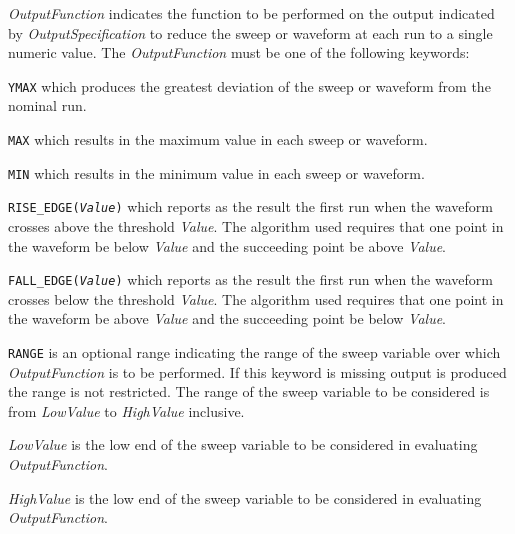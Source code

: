 {\begin{widelist}
\item[{\it OutputFunction}] indicates the function to be performed on the
     output indicated by {\it OutputSpecification} to reduce the sweep
     or waveform at each run to a single numeric value. The
     {\it OutputFunction} must be one of the following keywords:
     \item[{\tt YMAX}] which produces the greatest deviation of the sweep or
                       waveform from the nominal run.


     \item[{\tt MAX}] which results in the maximum value in each sweep or
                      waveform.

     \item[{\tt MIN}] which results in the minimum value in each sweep or
                      waveform.

     \item[{\tt RISE\_EDGE({\it Value})}] which reports as the result the
                      first run when the waveform crosses above the threshold
              {\it Value}.
              The algorithm used requires that
              one point in the waveform be below {\it Value}
              and the succeeding point be above {\it Value}.
\end{widelist}
\clearpage

\begin{widelist}
     \item[{\tt FALL\_EDGE({\it Value})}] which reports as the result the
                      first run when the waveform crosses below the threshold
              {\it Value}.
              The algorithm used requires that
              one point in the waveform be above {\it Value}
              and the succeeding point be below {\it Value}.


\item[{\tt RANGE}] is an optional range indicating the range of the sweep
                  variable over which {\it OutputFunction} is to be performed.
          If this keyword is missing output is produced
          the range is not restricted.  The range of the sweep
          variable to be considered is from {\it LowValue}
          to {\it HighValue} inclusive.

\item[{\it LowValue}] is the low end of the sweep variable to be considered
                  in evaluating {\it OutputFunction}.


\item[{\it HighValue}] is the low end of the sweep variable to be considered
                  in evaluating {\it OutputFunction}.


\end{widelist}}
